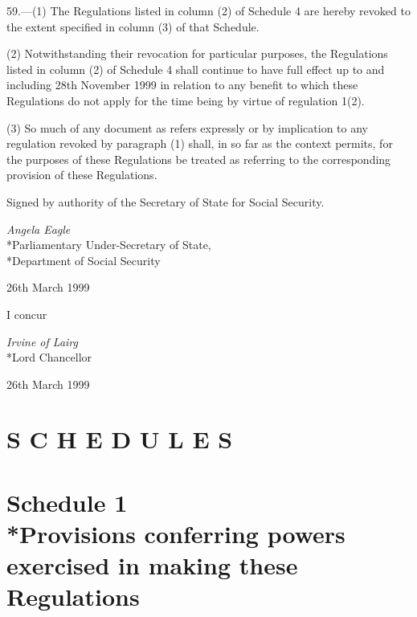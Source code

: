 \documentclass[12pt,a4paper]{article}
\begin{document}
\renewcommand\parthead{--- Part VI}

59.—(1) The Regulations listed in column (2) of Schedule 4 are hereby revoked to the extent specified in column (3) of that Schedule.

(2) Notwithstanding their revocation for particular purposes, the Regulations listed in column (2) of Schedule 4 shall continue to have full effect up to and including 28th November 1999 in relation to any benefit to which these Regulations do not apply for the time being by virtue of regulation 1(2).

(3) So much of any document as refers expressly or by implication to any regulation revoked by paragraph (1) shall, in so far as the context permits, for the purposes of these Regulations be treated as referring to the corresponding provision of these Regulations.

\bigskip

Signed 
by authority of the Secretary of State for Social Security.

{\raggedleft
\emph{Angela Eagle}\\*Parliamentary Under-Secretary of State,\\*Department of Social Security

}

26th March 1999

\bigskip

I concur

{\raggedleft
\emph{Irvine of Lairg}\\*Lord Chancellor

}

26th March 1999

\small

\part*{S C H E D U L E S}

\part[Schedule 1 --- Provisions conferring powers exercised in making these Regulations]{Schedule 1\\*Provisions conferring powers exercised in making these Regulations}

\renewcommand\parthead{--- Schedule 1}
\end{document}
